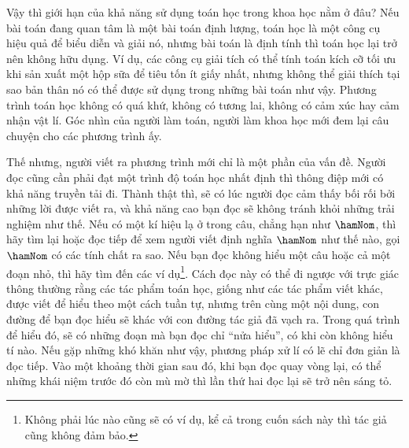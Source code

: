 Vậy thì giới hạn của khả năng sử dụng toán học trong khoa học nằm ở đâu? Nếu bài toán đang quan tâm là một bài toán định lượng, toán học là một công cụ hiệu quả để biểu diễn và giải nó, nhưng bài toán là định tính thì toán học lại trở nên không hữu dụng. Ví dụ, các công cụ giải tích có thể tính toán kích cỡ tối ưu khi sản xuất một hộp sữa để tiêu tốn ít giấy nhất, nhưng không thể giải thích tại sao bản thân nó có thể được sử dụng trong những bài toán như vậy. Phương trình toán học không có quá khứ, không có tương lai, không có cảm xúc hay cảm nhận vật lí. Góc nhìn của người làm toán, người làm khoa học mới đem lại câu chuyện cho các phương trình ấy.

Thế nhưng, người viết ra phương trình mới chỉ là một phần của vấn đề. Người đọc cũng cần phải đạt một trình độ toán học nhất định thì thông điệp mới có khả năng truyền tải đi. Thành thật thì, sẽ có lúc người đọc cảm thấy bối rối bởi những lời được viết ra, và khả năng cao bạn đọc sẽ không tránh khỏi những trải nghiệm như thế. Nếu có một kí hiệu lạ ở trong câu, chẳng hạn như $\hamNom$, thì hãy tìm lại hoặc đọc tiếp để xem người viết định nghĩa $\hamNom$ như thế nào, gọi $\hamNom$ có các tính chất ra sao. Nếu bạn đọc không hiểu một câu hoặc cả một đoạn nhỏ, thì hãy tìm đến các ví dụ\footnote{Không phải lúc nào cũng sẽ có ví dụ, kể cả trong cuốn sách này thì tác giả cũng không đảm bảo.}. Cách đọc này có thể đi ngược với trực giác thông thường rằng các tác phẩm toán học, giống như các tác phẩm viết khác, được viết để hiểu theo một cách tuần tự, nhưng trên cùng một nội dung, con đường để bạn đọc hiểu sẽ khác với con đường tác giả đã vạch ra. Trong quá trình để hiểu đó, sẽ có những đoạn mà bạn đọc chỉ ``nửa hiểu'', có khi còn không hiểu tí nào. Nếu gặp những khó khăn như vậy, phương pháp xử lí có lẽ chỉ đơn giản là đọc tiếp. Vào một khoảng thời gian sau đó, khi bạn đọc quay vòng lại, có thể những khái niệm trước đó còn mù mờ thì lần thứ hai đọc lại sẽ trở nên sáng tỏ.